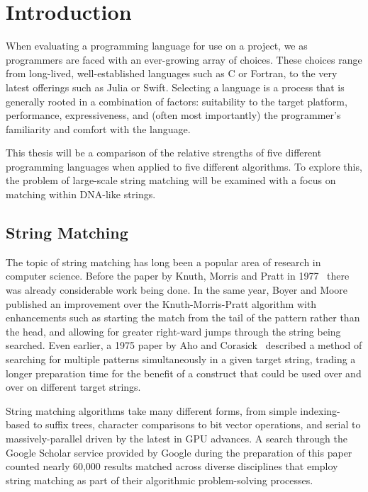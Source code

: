 \section{Introduction}
\label{sec:introduction}

When evaluating a programming language for use on a project, we as programmers are faced with an ever-growing array of choices. These choices range from long-lived, well-established languages such as C or Fortran, to the very latest offerings such as Julia or Swift. Selecting a language is a process that is generally rooted in a combination of factors: suitability to the target platform, performance, expressiveness, and (often most importantly) the programmer's familiarity and comfort with the language.

This thesis will be a comparison of the relative strengths of five different programming languages when applied to five different algorithms. To explore this, the problem of large-scale string matching will be examined with a focus on matching within DNA-like strings.

\subsection{String Matching}

The topic of string matching has long been a popular area of research in computer science. Before the paper by Knuth, Morris and Pratt in 1977~\cite{knuth} there was already considerable work being done. In the same year, Boyer and Moore~\cite{boyer} published an improvement over the Knuth-Morris-Pratt algorithm with enhancements such as starting the match from the tail of the pattern rather than the head, and allowing for greater right-ward jumps through the string being searched. Even earlier, a 1975 paper by Aho and Corasick~\cite{aho} described a method of searching for multiple patterns simultaneously in a given target string, trading a longer preparation time for the benefit of a construct that could be used over and over on different target strings.

String matching algorithms take many different forms, from simple indexing-based to suffix trees, character comparisons to bit vector operations, and serial to massively-parallel driven by the latest in GPU advances. A search through the Google Scholar service provided by Google during the preparation of this paper counted nearly 60,000 results matched across diverse disciplines that employ string matching as part of their algorithmic problem-solving processes.

